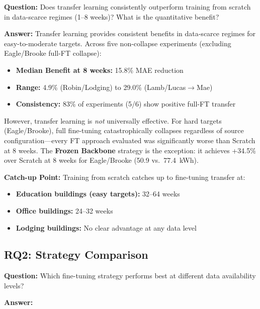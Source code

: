 \documentclass[12pt,a4paper]{report}
\begin{document}
\textbf{Question:} Does transfer learning consistently outperform training from scratch in data-scarce regimes (1--8 weeks)? What is the quantitative benefit?

\textbf{Answer:} Transfer learning provides consistent benefits in data-scarce regimes for easy-to-moderate targets. Across five non-collapse experiments (excluding Eagle/Brooke full-FT collapse):

\begin{itemize}
    \item \textbf{Median Benefit at 8 weeks:} 15.8\% MAE reduction
    \item \textbf{Range:} 4.9\% (Robin/Lodging) to 29.0\% (Lamb/Lucas$\to$Mae)
    \item \textbf{Consistency:} 83\% of experiments (5/6) show positive full-FT transfer
\end{itemize}

However, transfer learning is \textit{not} universally effective. For hard targets (Eagle/Brooke), full fine-tuning catastrophically collapses regardless of source configuration---every FT approach evaluated was significantly worse than Scratch at 8 weeks. The \textbf{Frozen Backbone} strategy is the exception: it achieves +34.5\% over Scratch at 8 weeks for Eagle/Brooke (50.9 vs.\ 77.4~kWh).

\textbf{Catch-up Point:} Training from scratch catches up to fine-tuning transfer at:
\begin{itemize}
    \item \textbf{Education buildings (easy targets):} 32--64 weeks
    \item \textbf{Office buildings:} 24--32 weeks
    \item \textbf{Lodging buildings:} No clear advantage at any data level
\end{itemize}

\subsection{RQ2: Strategy Comparison}

\textbf{Question:} Which fine-tuning strategy performs best at different data availability levels?

\textbf{Answer:}
\end{document}
